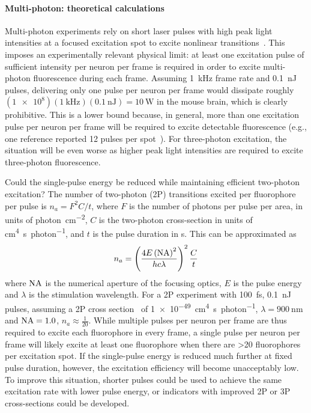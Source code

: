 \paragraph{Multi-photon: theoretical calculations}
Multi-photon experiments rely on short laser pulses with high peak light intensities at a focused excitation spot to excite nonlinear transitions~\cite{kim99}.
This imposes an experimentally relevant physical limit: at least one excitation pulse of sufficient intensity per neuron per frame is required in order to excite multi-photon fluorescence during each frame.
Assuming \SI{1}{\kilo\hertz} frame rate and \SI{0.1}{\nano\joule} pulses, delivering only one pulse per neuron per frame would dissipate roughly $\left(\num{1e8}\right)\left(\SI{1}{\kilo\hertz}\right)\left(\SI{0.1}{\nano\joule}\right)=\SI{10}{\watt}$ in the mouse brain, which is clearly prohibitive.
This is a lower bound because, in general, more than one excitation pulse per neuron per frame will be required to excite detectable fluorescence (e.g., one reference reported 12 pulses per spot~\cite{kim99}).
For three-photon excitation, the situation will be even worse as higher peak light intensities are required to excite three-photon fluorescence.

Could the single-pulse energy be reduced while maintaining efficient two-photon excitation? The number of two-photon (2P) transitions excited per fluorophore per pulse is $n_a = F^2 C / t$, where $F$ is the number of photons per pulse per area, in units of \si{photon\per\centi\meter\squared}, $C$ is the two-photon cross-section in units of \si{\centi\meter\tothe{4}\second\per photon}, and $t$ is the pulse duration in \si{\second}.
This can be approximated as
\[n_a = \left(\frac{4E\left(\text{NA}\right)^2}{h c \lambda}\right)^2 \frac{C}{t}\]
where $\text{NA}$ is the numerical aperture of the focusing optics, $E$ is the pulse energy and $\lambda$ is the stimulation wavelength.
For a 2P experiment with \SI{100}{\femto\second}, \SI{0.1}{\nano\joule} pulses, assuming a 2P cross section~\cite{masters06} of \SI{1e-49}{\centi\meter\tothe{4}\second\per photon}, $\lambda=\SI{900}{\nano\meter}$ and $\text{NA}=1.0$, $n_a \approx \frac{1}{20}$.
While multiple pulses per neuron per frame are thus required to excite each fluorophore in every frame, a single pulse per neuron per frame will likely excite at least one fluorophore when there are \num{>20} fluorophores per excitation spot.
If the single-pulse energy is reduced much further at fixed pulse duration, however, the excitation efficiency will become unacceptably low.
To improve this situation, shorter pulses could be used to achieve the same excitation rate with lower pulse energy, or indicators with improved 2P or 3P cross-sections could be developed.

